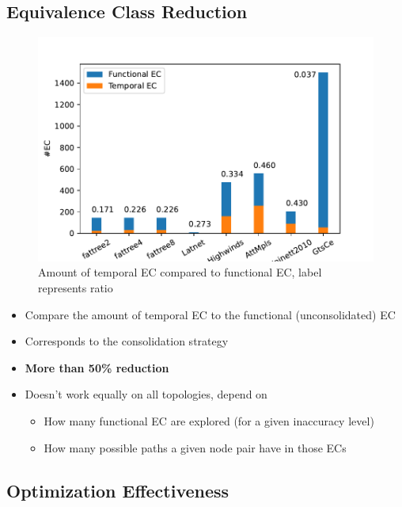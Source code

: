 \documentclass[10pt,sigconf,letterpaper,anonymous,nonacm]{acmart}
\begin{document}
\subsection{Equivalence Class Reduction}

\begin{figure}[h]
    \centering
    \includegraphics[scale=0.5]{ec}
    \caption{Amount of temporal EC compared to functional EC, label represents ratio}
    \label{fig:ec}
\end{figure}

\begin{itemize}
    \item Compare the amount of temporal EC to the functional (unconsolidated) EC
    \item Corresponds to the consolidation strategy
    \item \textbf{More than 50\% reduction}
    \item Doesn't work equally on all topologies, depend on 
    \begin{itemize}
        \item How many functional EC are explored (for a given inaccuracy level)
        \item How many possible paths a given node pair have in those ECs
    \end{itemize}
\end{itemize}

\subsection{Optimization Effectiveness}
\end{document}

